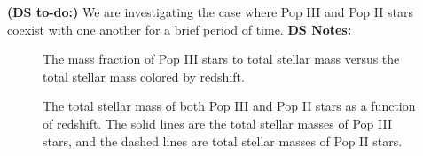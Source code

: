 \documentclass[11pt]{article}
\begin{document}
\textbf{(DS to-do:)} We are investigating the case where Pop III and Pop II stars coexist with one another for a brief period of time. 
\textbf{DS Notes:}
\begin{figure}[h]
    \centering
    \qquad
    \caption{The mass fraction of Pop III stars to total stellar mass versus the total stellar mass colored by redshift.}%
    \label{fig:ratio}%
\end{figure}

\begin{figure}[h]
    \centering
    \qquad
    \caption{The total stellar mass of both Pop III and Pop II stars as a function of redshift. The solid lines are the total stellar masses of Pop III stars, and the dashed lines are total stellar masses of Pop II stars.}%
    \label{fig:ratio}%
\end{figure}
\end{document}
